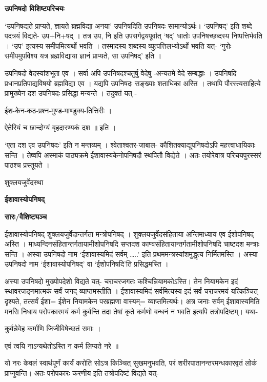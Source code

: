 \documentclass[11pt, a5paper]{article}
\begin{document}
\textbf{उपनिषदो विशिष्टपरिचयः}

‘उपनिषद्यते प्राप्यते, ज्ञायते ब्रह्मविद्या अनया’ उपनिषदिति उपनिषदः सामान्योऽर्थः। ‘उपनिषद्’ इति शब्दे पदत्रयं विद्यते- उप+नि+षद् । तत्र उप, नि इति उपसर्गद्वयपूर्वात् ‘षद्’ धातोः उपनिषच्छब्दस्य निष्पत्तिर्भवति । ‘उप’ इत्यस्य समीपमित्यर्थो भवति । तस्मादस्य शब्दस्य व्युत्पत्तिलभ्योऽर्थो भवति यत्- ‘गुरोः समीपमुपविश्य यत्र ब्रह्मविद्याया ज्ञानं प्राप्यते, सा उपनिषद्’ इति ।

उपनिषदो वेदस्यांशभूता एव । सर्वा अपि उपनिषदश्चतुर्षु वेदेषु -अन्यतमे वेदे सम्बद्धाः । उपनिषदि प्रधानप्रतिपाद्यविषयो ब्रह्मविद्या एव । यद्यपि उपनिषदः सङ्‌ख्याः शताधिका अस्ति । तथापि पौरस्त्यसाहित्ये प्रामुख्येन दश उपनिषदः प्रसिद्धा मन्यन्ते । तदुक्तं यत् -

ईश-केन-कठ-प्रश्न-मुण्ड-माण्डुक्य-तित्तिरीः ।

ऐतेरियं च छान्दोग्यं बृहदारण्यकं दश ॥ इति ।

‘एता दश एव उपनिषदः’ इति न मन्तव्यम् । श्वेताश्वतर-जाबाल- कौशितक्याद्युपनिषदोऽपि महत्त्वाधायिकाः सन्ति । तेष्वपि अस्माकं पाठ्यक्रमे ईशावास्यकेनोपनिषदौ स्थपितौ विद्येते । अतः तयोरेवात्र परिचयपुरस्सरं पाठश्च प्रस्तूयते ।

शुक्लयजुर्वेदस्था

\textbf{ईशावास्योपनिषद्}

\textbf{सारः/वैशिष्ट्यञ्च}

ईशावास्योपनिषद् शुक्लयजुर्वेदान्तर्गता मन्त्रोपनिषद् । शुक्लयजुर्वेदसंहिताया अन्तिमाध्याय एव ईशोपनिषद् अस्ति । माध्यन्दिनसंहितान्तर्गतायामीशोपनिषदि सप्तदश काण्वसंहितायान्तर्गतामीशोपनिषदि चाष्टदश मन्त्राः सन्ति । अस्या उपनिषदो नाम ‘ईशावास्यमिदं सर्वम् …..’ इति प्रथममन्त्रस्यांशमुद्धृत्य निर्मितमस्ति । अस्या उपनिषदो नाम ‘ईशावास्योपनिषद्’ वा ‘ईशोपनिषदि’ति प्रसिद्धमस्ति ।

अस्या उपनिषदो मुख्योपदेशो विद्यते यत्-  चराचरजगतः कश्चिन्नियामकोऽस्ति। तेन नियामकेन इदं स्थावरजङ्गमात्मकं सर्वं जगद् व्याप्तमस्तीति । ईशावास्यमिदं सर्वमित्यस्य इदं सर्वं चराचरमयं यत्किञ्चित् दृश्यते, तत्सर्वं ईशा= ईशेन नियामकेन परब्रह्मणा वास्यम्= व्याप्तमित्यर्थः। अत्र जनाः सर्वम् ईशावास्यमिति मनसि निधाय परोपकारमयं कर्म कुर्वन्ति तदा तेषां कृते कर्मणो बन्धनं न भवति इत्यपि तत्रोपदिष्टम्। यथा-

कुर्वन्नेवेह कर्माणि जिजीविषेच्छतं समाः ।

एवं त्वयि नाऽन्यथेतोऽस्ति न कर्म लिप्यते नरे ॥

यो नरः केवलं स्वार्थपूर्णं कार्यं करोति सोऽत्र किञ्चित् सुखमनुभवति, परं शरीरपातानन्तरमन्धकारवृतं लोकं प्राप्नुवन्ति। अतः परोपकारः करणीय इति तत्रोपदिष्टं विद्यते यत्-
\end{document}
